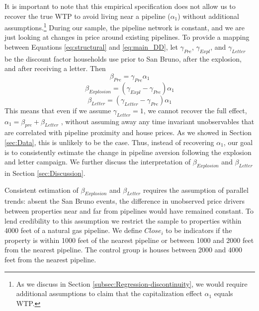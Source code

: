 \documentclass[12pt]{article}
\begin{document}
It is important to note that this empirical specification does not
allow us to recover the true WTP to avoid living near a pipeline ($\alpha_{1}$)
without additional assumptions.\footnote{As we discuss in Section \ref{subsec:Regression-discontinuity}, we
would require additional assumptions to claim that the capitalization
effect $\alpha_{1}$ equals WTP. } During our sample, the pipeline network is constant, and we are just
looking at changes in price around existing pipelines. To provide
a mapping between Equations \ref{eq:structural} and \ref{eq:main_DD},
let $\gamma_{Pre}$, $\gamma_{Expl}$, and $\gamma_{Letter}$ be the
discount factor households use prior to San Bruno, after the explosion,
and after receiving a letter. Then 
\[
\beta_{Pre}=\gamma_{Pre}\alpha_{1}
\]
\begin{equation}
\beta_{Explosion}=(\gamma_{Expl}-\gamma_{Pre})\alpha_{1}\label{eq:betaExpl}
\end{equation}
\begin{equation}
\beta_{Letter}=(\gamma_{Letter}-\gamma_{Pre})\alpha_{1}\label{eq:betaLetter}
\end{equation}
This means that even if we assume $\gamma_{Letter}=1$, we cannot
recover the full effect, $\alpha_{1}=\beta_{pre}+\beta_{Letter}$
, without assuming away any time invariant unobservables that are
correlated with pipeline proximity and house prices. As we showed
in Section \ref{sec:Data}, this is unlikely to be the case. Thus,
instead of recovering $\alpha_{1}$, our goal is to consistently estimate
the change in pipeline aversion following the explosion and letter
campaign. We further discuss the interpretation of $\beta_{Explosion}$
and $\beta_{Letter}$ in Section \ref{sec:Discussion}. 

Consistent estimation of $\beta_{Explosion}$ and $\beta_{Letter}$
requires the assumption of parallel trends: absent the San Bruno events,
the difference in unobserved price drivers between properties near
and far from pipelines would have remained constant. To lend credibility
to this assumption we restrict the sample to properties within 4000
feet of a natural gas pipeline. We define $Close_{i}$ to be indicators
if the property is within 1000 feet of the nearest pipeline or between
1000 and 2000 feet from the nearest pipeline. The control group is
houses between 2000 and 4000 feet from the nearest pipeline. 
\end{document}
